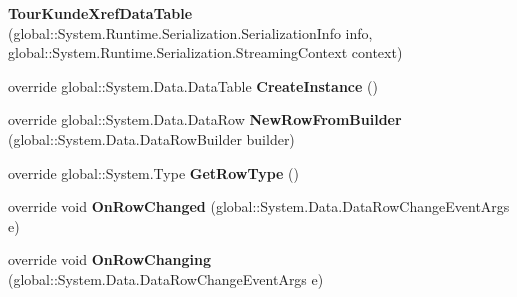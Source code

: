 \begin{DoxyCompactItemize}
\item 
{\bfseries Tour\+Kunde\+Xref\+Data\+Table} (global\+::\+System.\+Runtime.\+Serialization.\+Serialization\+Info info, global\+::\+System.\+Runtime.\+Serialization.\+Streaming\+Context context)\hypertarget{class_products_1_1_data_1_1ds_sage_1_1_tour_kunde_xref_data_table_af8ff8e924ce7646d2fae4758d96ab47c}{}\label{class_products_1_1_data_1_1ds_sage_1_1_tour_kunde_xref_data_table_af8ff8e924ce7646d2fae4758d96ab47c}

\item 
override global\+::\+System.\+Data.\+Data\+Table {\bfseries Create\+Instance} ()\hypertarget{class_products_1_1_data_1_1ds_sage_1_1_tour_kunde_xref_data_table_aa0b1d1fbb4e66cd347e17a75f5d9ed8a}{}\label{class_products_1_1_data_1_1ds_sage_1_1_tour_kunde_xref_data_table_aa0b1d1fbb4e66cd347e17a75f5d9ed8a}

\item 
override global\+::\+System.\+Data.\+Data\+Row {\bfseries New\+Row\+From\+Builder} (global\+::\+System.\+Data.\+Data\+Row\+Builder builder)\hypertarget{class_products_1_1_data_1_1ds_sage_1_1_tour_kunde_xref_data_table_a2b54fc97079ca9f4facaafa41852e275}{}\label{class_products_1_1_data_1_1ds_sage_1_1_tour_kunde_xref_data_table_a2b54fc97079ca9f4facaafa41852e275}

\item 
override global\+::\+System.\+Type {\bfseries Get\+Row\+Type} ()\hypertarget{class_products_1_1_data_1_1ds_sage_1_1_tour_kunde_xref_data_table_a9240d5abc5e2da09c71a2aa401125a1b}{}\label{class_products_1_1_data_1_1ds_sage_1_1_tour_kunde_xref_data_table_a9240d5abc5e2da09c71a2aa401125a1b}

\item 
override void {\bfseries On\+Row\+Changed} (global\+::\+System.\+Data.\+Data\+Row\+Change\+Event\+Args e)\hypertarget{class_products_1_1_data_1_1ds_sage_1_1_tour_kunde_xref_data_table_aedd9a28f306c56ca70b42beab037cc5e}{}\label{class_products_1_1_data_1_1ds_sage_1_1_tour_kunde_xref_data_table_aedd9a28f306c56ca70b42beab037cc5e}

\item 
override void {\bfseries On\+Row\+Changing} (global\+::\+System.\+Data.\+Data\+Row\+Change\+Event\+Args e)\hypertarget{class_products_1_1_data_1_1ds_sage_1_1_tour_kunde_xref_data_table_a69bb6bb0ba6ed7a14b3e262c12f89fc8}{}\label{class_products_1_1_data_1_1ds_sage_1_1_tour_kunde_xref_data_table_a69bb6bb0ba6ed7a14b3e262c12f89fc8}


\end{DoxyCompactItemize}
